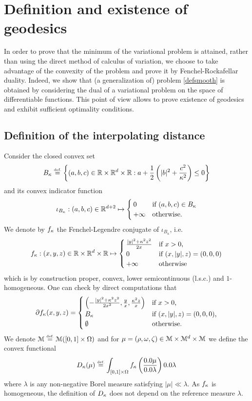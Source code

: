 
\section{Definition and existence of geodesics}
\label{sec:theory}

In order to prove that the minimum of the variational problem is attained, rather than using the direct method of calculus of variation, we choose to take advantage of the convexity of the problem and prove it by Fenchel-Rockafellar duality. Indeed, we show that (a generalization of) problem  \eqref{defsmooth} is obtained by considering the dual of a variational problem on the space of differentiable functions. This point of view allows to %
prove existence of geodesics and exhibit sufficient optimality conditions.

\subsection{Definition of the interpolating distance}
\label{subsec:average}

Consider the closed convex set
\[
B_{\kappa} \stackrel{\mbox{\upshape\tiny def.}}{=} \left\{ (a,b,c)\in \mathbb{R} \times \mathbb{R}^d \times \mathbb{R} : a+\frac{1}{2}\left( |b|^2+\frac{c^2}{\kappa^2} \right) \leq 0 \right\}
\]
and its convex indicator function
\[
\iota_{B_{\kappa}} : (a,b,c) \in \mathbb{R}^{d+2} \mapsto 
\begin{cases}
0 & \text{if } (a,b,c) \in B_{\kappa} \\
+ \infty & \text{otherwise.}
\end{cases}
\]
We denote by $f_{\kappa}$ the Fenchel-Legendre conjugate of $\iota_{B_{\kappa}}$, i.e.
\[
f_{\kappa} : (x,y,z)\in \mathbb{R}\times\mathbb{R}^d\times\mathbb{R} \mapsto
\begin{cases}
\frac{\vert y \vert^2 + \kappa^2 z^2 }{2x} &\text{if $x>0$,}\\
0 & \text{if } (x,|y|,z)=(0,0,0)\\
+\infty & \text{otherwise}
\end{cases}
\]
which is by construction proper, convex, lower semicontinuous (l.s.c.) and $1$-homogeneous. One can check by direct computations that
\begin{equation}
\label{subdiff fonctional}
\D \fonc (x,y,z) =
\begin{cases}
\left( -\frac{|y|^2+\kappa^2 z^2}{2x^2}, \frac{y}{x},\frac{\kappa^2 z}{x} \right)& \text{if $x>0$,}\\
B_{\kappa}& \text{if $(x,|y|,z)=(0,0,0)$,}\\
\emptyset & \text{otherwise}.
\end{cases}
\end{equation}
We denote $\mathcal{M} \stackrel{\mbox{\upshape\tiny def.}}{=} \mathcal{M}([0,1]\times \Omega)$ and for $\mu=(\rho,\omega,\zeta) \in \mathcal{M}\times \mathcal{M}^d \times \mathcal{M}$ we define the convex functional
\[
\ifonc(\mu) \defeq \int_{[0,1] \times \Om} \fonc\left(\frac{\d\mu}{\d\lambda}\right) \d\lambda
\]
where $\lambda$ is any non-negative Borel measure satisfying $\vert \mu \vert \ll \lambda$. As $f_{\kappa}$ is homogeneous, the definition of $D_{\kappa}$ does not depend on the reference measure $\lambda$.



